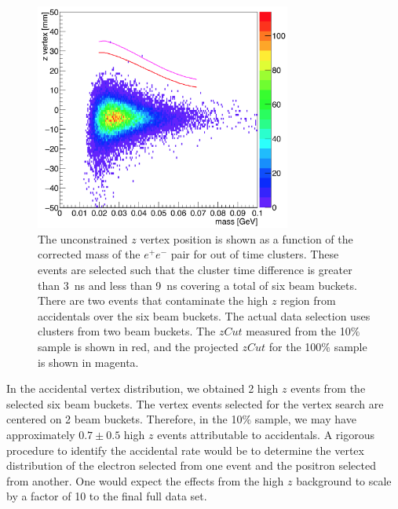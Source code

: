 \begin{figure}[htb]
  \centering
      \includegraphics[width=0.75\textwidth]{pics/searching/zVm_acc_L1L1.png}
  \caption[Vertex position vs mass for the 10$\%$ L1L1 accidentals]{The unconstrained $z$ vertex position is shown as a function of the corrected mass of the $e^+e^-$ pair for out of time clusters. These events are selected such that the cluster time difference is greater than 3~ns and less than 9~ns covering a total of six beam buckets. There are two events that contaminate the high $z$ region from accidentals over the six beam buckets. The actual data selection uses clusters from two beam buckets. The $zCut$ measured from the 10$\%$ sample is shown in red, and the projected $zCut$ for the 100$\%$ sample is shown in magenta.}
  \label{fig:zVm_acc}
\end{figure} 
In the accidental vertex distribution, we obtained 2 high $z$ events from the selected six beam buckets. The vertex events selected for the vertex search are centered on 2 beam buckets. Therefore, in the 10$\%$ sample, we may have approximately $0.7\pm0.5$ high $z$ events attributable to accidentals. A rigorous procedure to identify the accidental rate would be to determine the vertex distribution of the electron selected from one event and the positron selected from another. One would expect the effects from the high $z$ background to scale by a factor of 10 to the final full data set. 